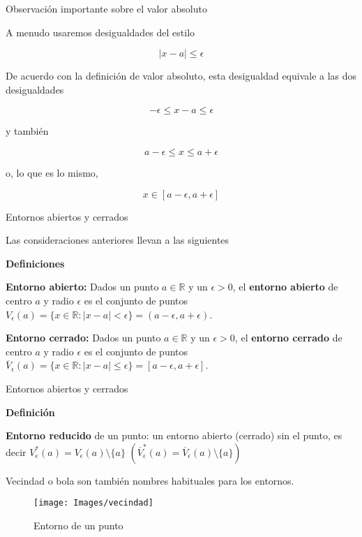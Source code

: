 \documentclass[ignorenonframetext,]{beamer}
\begin{document}
\begin{frame}{Observación importante sobre el valor absoluto}
\protect\hypertarget{observaciuxf3n-importante-sobre-el-valor-absoluto}{}

A menudo usaremos desigualdades del estilo

\[
|x-a|\leq \epsilon
\]

De acuerdo con la definición de valor absoluto, esta desigualdad
equivale a las dos desigualdades

\[
-\epsilon \leq x-a \leq \epsilon
\]

y también

\[
a-\epsilon \leq x \leq a+ \epsilon
\]

o, lo que es lo mismo,

\[
x \in [a-\epsilon,a+\epsilon]
\]

\end{frame}

\begin{frame}{Entornos abiertos y cerrados}
\protect\hypertarget{entornos-abiertos-y-cerrados}{}

Las consideraciones anteriores llevan a las siguientes

 \textbf{Definiciones}

\textbf{Entorno abierto:} Dados un punto \(a \in \mathbb{R}\) y un
\(\epsilon >0\), el \textbf{entorno abierto} de centro \(a\) y radio
\(\epsilon\) es el conjunto de puntos
\(V_{\epsilon}(a)=\{ x \in \mathbb{R}: |x-a|<\epsilon \} = (a-\epsilon, a+\epsilon)\).

\textbf{Entorno cerrado:} Dados un punto \(a \in \mathbb{R}\) y un
\(\epsilon >0\), el \textbf{entorno cerrado} de centro \(a\) y radio
\(\epsilon\) es el conjunto de puntos
\(\overline{V}_{\epsilon}(a)=\{ x \in \mathbb{R}: |x-a| \leq \epsilon \} = [a-\epsilon, a+\epsilon]\).

\end{frame}

\begin{frame}{Entornos abiertos y cerrados}
\protect\hypertarget{entornos-abiertos-y-cerrados-1}{}

 \textbf{Definición}

\textbf{Entorno reducido} de un punto: un entorno abierto (cerrado) sin
el punto, es decir \(V^*_{\epsilon}(a)=V_{\epsilon}(a) \setminus \{a\}\)
\(\left(\overline{V}^*_{\epsilon}(a) = \overline{V}_{\epsilon}(a) \setminus \{a\}\right)\)

Vecindad o bola son también nombres habituales para los entornos.

\begin{figure}
\texttt{[image: Images/vecindad]} \caption{Entorno de un punto}\label{fig:vecin}
\end{figure}

\end{frame}
\end{document}
